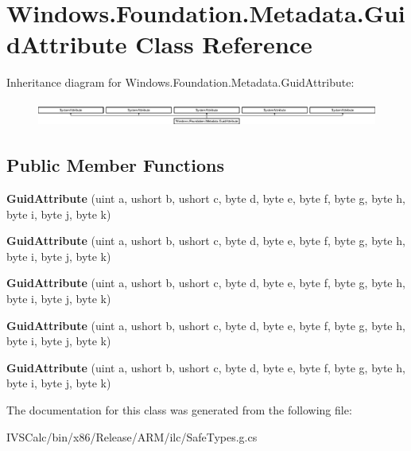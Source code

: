 \hypertarget{class_windows_1_1_foundation_1_1_metadata_1_1_guid_attribute}{}\section{Windows.\+Foundation.\+Metadata.\+Guid\+Attribute Class Reference}
\label{class_windows_1_1_foundation_1_1_metadata_1_1_guid_attribute}
Inheritance diagram for Windows.\+Foundation.\+Metadata.\+Guid\+Attribute\+:\begin{figure}[H]
\begin{center}
\leavevmode
\includegraphics[height=0.829630cm]{class_windows_1_1_foundation_1_1_metadata_1_1_guid_attribute}
\end{center}
\end{figure}
\subsection*{Public Member Functions}
\begin{DoxyCompactItemize}
\item 
\mbox{\label{class_windows_1_1_foundation_1_1_metadata_1_1_guid_attribute_ad0640d520fc7ad39618ac296bfa765a3}} 
{\bfseries Guid\+Attribute} (uint a, ushort b, ushort c, byte d, byte e, byte f, byte g, byte h, byte i, byte j, byte k)
\item 
\mbox{\label{class_windows_1_1_foundation_1_1_metadata_1_1_guid_attribute_ad0640d520fc7ad39618ac296bfa765a3}} 
{\bfseries Guid\+Attribute} (uint a, ushort b, ushort c, byte d, byte e, byte f, byte g, byte h, byte i, byte j, byte k)
\item 
\mbox{\label{class_windows_1_1_foundation_1_1_metadata_1_1_guid_attribute_ad0640d520fc7ad39618ac296bfa765a3}} 
{\bfseries Guid\+Attribute} (uint a, ushort b, ushort c, byte d, byte e, byte f, byte g, byte h, byte i, byte j, byte k)
\item 
\mbox{\label{class_windows_1_1_foundation_1_1_metadata_1_1_guid_attribute_ad0640d520fc7ad39618ac296bfa765a3}} 
{\bfseries Guid\+Attribute} (uint a, ushort b, ushort c, byte d, byte e, byte f, byte g, byte h, byte i, byte j, byte k)
\item 
\mbox{\label{class_windows_1_1_foundation_1_1_metadata_1_1_guid_attribute_ad0640d520fc7ad39618ac296bfa765a3}} 
{\bfseries Guid\+Attribute} (uint a, ushort b, ushort c, byte d, byte e, byte f, byte g, byte h, byte i, byte j, byte k)
\end{DoxyCompactItemize}


The documentation for this class was generated from the following file\+:\begin{DoxyCompactItemize}
\item 
I\+V\+S\+Calc/bin/x86/\+Release/\+A\+R\+M/ilc/Safe\+Types.\+g.\+cs\end{DoxyCompactItemize}
